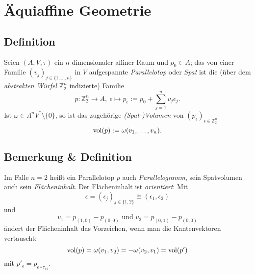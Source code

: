\section{Äquiaffine Geometrie}
\subsection{Definition}
	\begin{Definition}
		Seien $ (A,V,\tau) $ ein $ n $-dimensionaler affiner Raum und $ p_0\in A $; das von einer Familie $ (v_j)_{j\in \{1,\dots,n\}} $ in $ V $ aufgespannte \emph{Parallelotop} oder \emph{Spat} ist die (über dem \emph{abstrakten Würfel} $ \mathbb{Z}_2^n $ indizierte) Familie
			\[ p: \mathbb{Z}_2^n\to A,\ \epsilon \mapsto p_\epsilon := p_0 +\sum_{j=1}^{n}v_j\epsilon_j. \]
		Ist $ \omega\in\Lambda^nV^*\setminus\{0\} $, so ist das zugehörige \emph{(Spat-)Volumen} von $ (p_\epsilon)_{\epsilon \in \mathbb{Z}_2^n} $
			\[ \operatorname{vol}(p):= \omega(v_1,\dots,v_n). \]
	\end{Definition}
\begin{figure}[H]
	\centering
{}
\end{figure}
\subsection{Bemerkung \& Definition}
	\begin{Definition}
		Im Falle $ n=2 $ heißt ein Parallelotop $ p $ auch \emph{Parallelogramm}, sein Spatvolumen auch sein \emph{Flächeninhalt}. Der Flächeninhalt ist \emph{orientiert}:
		Mit
			\[ \epsilon = (\epsilon_j)_{j\in \{1,2\}}\cong (\epsilon_1,\epsilon_2) \]
		und
			\[ v_1 = p_{(1,0)}-p_{(0,0)}\text{ und } v_2 = p_{(0,1)}-p_{(0,0)} \]
		ändert der Flächeninhalt das Vorzeichen, wenn man die Kantenvektoren vertauscht:
			\[ \operatorname{vol}(p) = \omega(v_1,v_2) = -\omega(v_2,v_1) = \operatorname{vol}(p') \]
		mit $ p'_\epsilon = p_{\epsilon \circ \tau_{12}} $.
	\end{Definition}
